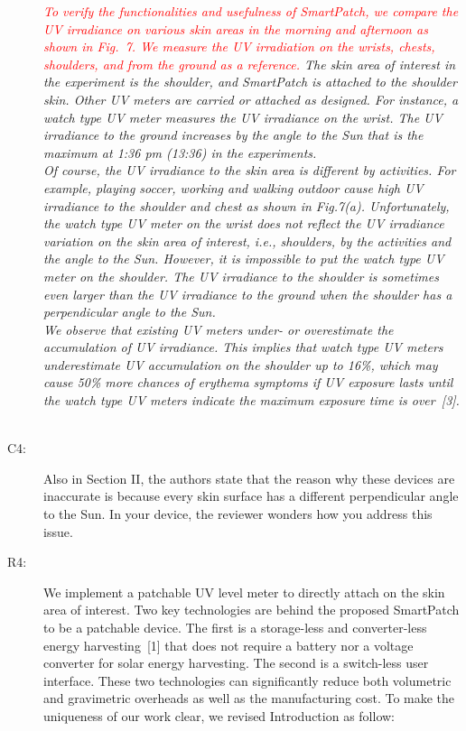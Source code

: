 \documentclass[onecolumn]{IEEEconf}
\begin{document}
\begin{description}
\textit{\textcolor{red}{To verify the functionalities and usefulness of SmartPatch, we compare the UV irradiance on various skin areas in the morning and afternoon as shown in Fig.~7. We measure the UV irradiation on the wrists, chests, shoulders, and from the ground as a reference.}
The skin area of interest in the experiment is the shoulder, and SmartPatch is attached to the shoulder skin. Other UV meters are carried or attached as designed. For instance, a watch type UV meter measures the UV irradiance on the wrist. The UV irradiance to the ground increases by the angle to the Sun that is the maximum at 1:36 pm (13:36) in the experiments.\\
%
Of course, the UV irradiance to the skin area is different by activities.
For example, playing soccer, working and walking outdoor cause high UV irradiance to the shoulder and chest as shown in Fig.7(a).
Unfortunately, the watch type UV meter on the wrist does not reflect the UV irradiance variation on the skin area of interest, i.e., shoulders, by the activities and the angle to the Sun.
However, it is impossible to put the watch type UV meter on the shoulder.
The UV irradiance to the shoulder is sometimes even larger than the UV irradiance to the ground when the shoulder has a perpendicular angle to the Sun.\\
%
We observe that existing UV meters under- or overestimate the accumulation of UV irradiance.
This implies that watch type UV meters underestimate UV accumulation on the shoulder up to 16\%, which may cause 50\% more chances of erythema symptoms if UV exposure lasts until the watch type UV meters indicate the maximum exposure time is over~[3].}\\
~\\

\item [C4: ] Also in Section II, the authors state that the reason why these devices are inaccurate is because every skin surface has a different perpendicular angle to the Sun. In your device, the reviewer wonders how you address this issue.
\item [R4: ] We implement a patchable UV level meter to directly attach on the skin area of interest. Two key technologies are behind the proposed SmartPatch to be a patchable device. The first is a storage-less and converter-less energy harvesting~[1] that does not require a battery nor a voltage converter for solar energy harvesting. The second is a switch-less user interface. These two technologies can significantly reduce both volumetric and gravimetric overheads as well as the manufacturing cost. To make the uniqueness of our work clear, we revised Introduction as follow:\\


\end{description}
\end{document}
